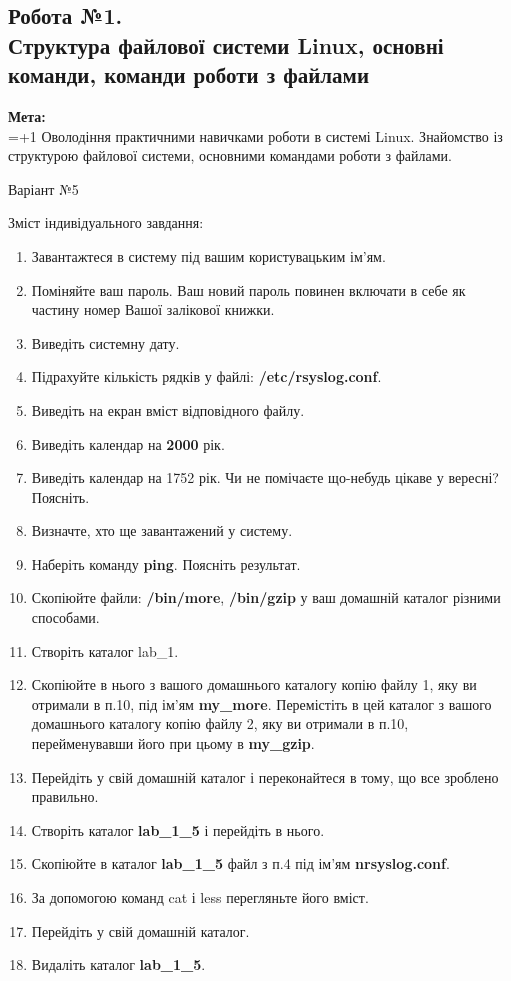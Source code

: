 \documentclass[a4paper,12pt]{article}
\begin{document}
\newpage
    \begin{center}
        \section*{\bfseries{Робота №1.\\
        Структура файлової системи Linux,
        основні команди, команди роботи з файлами
    }}
    \end{center}
    \textbf{Мета:} \\
    \hangindent=1.5cm 
    \hangafter=+1 \noindent
    Оволодіння практичними навичками роботи в системі
    Linux. Знайомство із структурою файлової системи,
    основними командами роботи з файлами. \\
    \begin{center}
        \Large{Варіант №5}
    \end{center}
    Зміст індивідуального завдання:
    \begin{enumerate}
        \item Завантажтеся в систему під вашим користувацьким ім'ям.
        \item Поміняйте ваш пароль. Ваш новий пароль повинен включати в себе як 
        частину номер Вашої залікової книжки.
        \item Виведіть системну дату.
        \item Підрахуйте кількість рядків у файлі: \textbf{/etc/rsyslog.conf}.
        \item Виведіть на екран вміст відповідного файлу.
        \item Виведіть календар на \textbf{2000} рік.
        \item Виведіть календар на 1752 рік. Чи не помічаєте що-небудь цікаве у вересні? Поясніть.
        \item Визначте, хто ще завантажений у систему.
        \item Наберіть команду \textbf{ping}. Поясніть результат.
        \item Скопіюйте файли: \textbf{/bin/more}, \textbf{/bin/gzip} у ваш домашній каталог різними способами.
        \item Створіть каталог lab\_1.
        \item Скопіюйте в нього з вашого домашнього каталогу копію файлу 1, яку ви отримали в п.10, 
        під ім'ям \textbf{my\_more}. Перемістіть в цей каталог з вашого домашнього каталогу копію файлу 2, 
        яку ви отримали в п.10, перейменувавши його при цьому в \textbf{my\_gzip}.
        \item Перейдіть у свій домашній каталог і переконайтеся в тому, що все зроблено правильно.
        \item Створіть каталог \textbf{lab\_1\_5} і перейдіть в нього.
        \item Скопіюйте в каталог \textbf{lab\_1\_5} файл з п.4 під ім'ям \textbf{nrsyslog.conf}.
        \item За допомогою команд cat і less перегляньте його вміст.
        \item Перейдіть у свій домашній каталог.
        \item Видаліть каталог \textbf{lab\_1\_5}.
    \end{enumerate}
\end{document}

